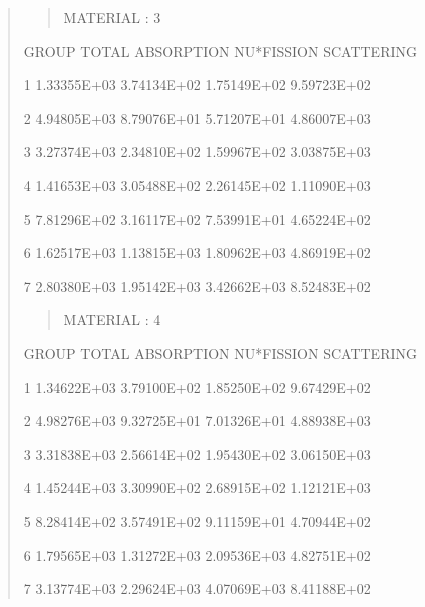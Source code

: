 \documentclass[letterpaper,10pt,english]{sphinxmanual}
\begin{document}
\begin{quote}
\begin{quote}
MATERIAL :   3
\end{quote}

\begin{DUlineblock}{0em}
\item[] GROUP           TOTAL        ABSORPTION      NU*FISSION      SCATTERING        \textbar{}
\end{DUlineblock}

\begin{DUlineblock}{0em}
\item[] 1          1.33355E+03     3.74134E+02     1.75149E+02     9.59723E+02      \textbar{}
\item[] 2          4.94805E+03     8.79076E+01     5.71207E+01     4.86007E+03      \textbar{}
\item[] 3          3.27374E+03     2.34810E+02     1.59967E+02     3.03875E+03      \textbar{}
\item[] 4          1.41653E+03     3.05488E+02     2.26145E+02     1.11090E+03      \textbar{}
\item[] 5          7.81296E+02     3.16117E+02     7.53991E+01     4.65224E+02      \textbar{}
\item[] 6          1.62517E+03     1.13815E+03     1.80962E+03     4.86919E+02      \textbar{}
\item[] 7          2.80380E+03     1.95142E+03     3.42662E+03     8.52483E+02      \textbar{}
\end{DUlineblock}
\begin{quote}

MATERIAL :   4
\end{quote}

\begin{DUlineblock}{0em}
\item[] GROUP           TOTAL        ABSORPTION      NU*FISSION      SCATTERING        \textbar{}
\end{DUlineblock}

\begin{DUlineblock}{0em}
\item[] 1          1.34622E+03     3.79100E+02     1.85250E+02     9.67429E+02      \textbar{}
\item[] 2          4.98276E+03     9.32725E+01     7.01326E+01     4.88938E+03      \textbar{}
\item[] 3          3.31838E+03     2.56614E+02     1.95430E+02     3.06150E+03      \textbar{}
\item[] 4          1.45244E+03     3.30990E+02     2.68915E+02     1.12121E+03      \textbar{}
\item[] 5          8.28414E+02     3.57491E+02     9.11159E+01     4.70944E+02      \textbar{}
\item[] 6          1.79565E+03     1.31272E+03     2.09536E+03     4.82751E+02      \textbar{}
\item[] 7          3.13774E+03     2.29624E+03     4.07069E+03     8.41188E+02      \textbar{}
\end{DUlineblock}
\begin{quote}


\end{quote}
\end{quote}
\end{document}
